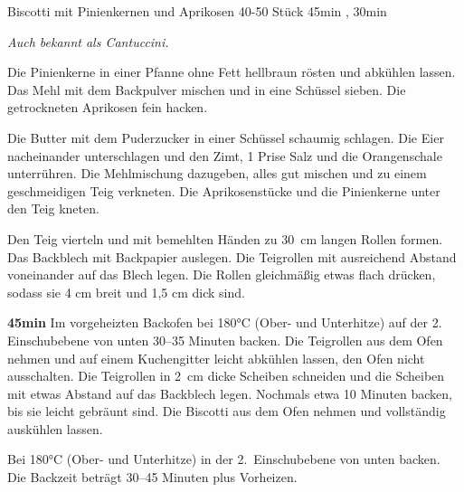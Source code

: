 \documentclass[../recipe-collections/cooking.tex]{subfiles}
\begin{document}
\begin{recipe}{Biscotti mit Pinienkernen und Aprikosen} {40-50 Stück } {45min , 30min }

  \freeform{}\textit{Auch bekannt als Cantuccini.}


  Die Pinienkerne in einer Pfanne ohne Fett hellbraun rösten und abkühlen lassen.
  Das Mehl mit dem Backpulver mischen und in eine Schüssel sieben.
  Die getrockneten Aprikosen fein hacken.


  Die Butter mit dem Puderzucker in einer Schüssel schaumig schlagen.
  Die Eier nacheinander unterschlagen und den Zimt, 1 Prise Salz und die Orangenschale unterrühren.
  Die Mehlmischung dazugeben, alles gut mischen und zu einem geschmeidigen Teig verkneten.
  Die Aprikosenstücke und die Pinienkerne unter den Teig kneten.


  \newstep{}Den Teig vierteln und mit bemehlten Händen zu 30~cm langen Rollen formen.
  Das Backblech mit Backpapier auslegen.
  Die Teigrollen mit ausreichend Abstand voneinander auf das Blech legen.
  Die Rollen gleichmäßig etwas flach drücken, sodass sie 4 cm breit und 1,5 cm dick sind.

  \newstep{}\textbf{45min}
  Im vorgeheizten Backofen bei 180°C (Ober- und Unterhitze) auf der 2. Einschubebene von unten 30–35 Minuten backen.
  Die Teigrollen aus dem Ofen nehmen und auf einem Kuchengitter leicht abkühlen lassen, den Ofen nicht ausschalten.
  Die Teigrollen in 2~cm dicke Scheiben schneiden und die Scheiben mit etwas Abstand auf das Backblech legen.
  Nochmals etwa 10 Minuten backen, bis sie leicht gebräunt sind.
  Die Biscotti aus dem Ofen nehmen und vollständig auskühlen lassen.

  \freeform{}\hrulefill{}

  \freeform{}
  Bei 180°C (Ober- und Unterhitze) in der 2.\ Einschubebene von unten backen.
  Die Backzeit beträgt 30–45 Minuten plus Vorheizen.

\end{recipe}
\end{document}
